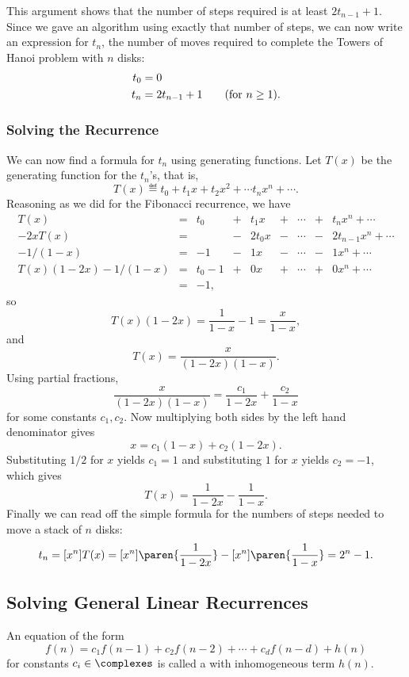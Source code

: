 This argument shows that the number of steps required is at least
$2t_{n-1} + 1$.  Since we gave an algorithm using exactly that number
of steps, we can now write an expression for $t_n$, the number of
moves required to complete the Towers of Hanoi problem with $n$ disks:
\begin{align*}
t_0 & = 0 \\
t_n & = 2t_{n-1} + 1 \text{\qquad (for $n \geq 1$)}.
\end{align*}

\subsubsection{Solving the Recurrence}
We can now find a formula for $t_n$ using generating functions.
Let $T(x)$ be the generating function for the $t_n$'s, that
is,
\[
T(x) \eqdef t_0 + t_1 x + t_2 x^2 + \cdots t_n x^n + \cdots.
\]
Reasoning as we did for the Fibonacci recurrence, we have
\[
\begin{array}{rcrcrcrcrcrcrcr}
T(x)     & = & t_0 & + &  t_1 x & + & \cdots & + &     t_n x^n + \cdots\\
-2xT(x)  & = &     & - & 2t_0 x & - & \cdots & - & 2t_{n-1} x^n + \cdots\\
-1/(1-x) & = &  -1 & -  &   1 x & - & \cdots & - &       1 x^n + \cdots\\
\hline
T(x)(1-2x) - 1/(1-x)
         & = & t_0 -1 & + & 0 x & + & \cdots & + &       0 x^n + \cdots\\
         & = & -1,
\end{array}
\]
so
\[
T(x)(1-2x) = \frac{1}{1-x} -1 = \frac{x}{1-x},
\]
and
\[
T(x) = \frac{x}{(1-2x)(1-x)}.
\]
Using partial fractions,
\[
 \frac{x}{(1-2x)(1-x)} = \frac{c_1}{1-2x} +\frac{c_2}{1-x}
\]
for some constants $c_1,c_2$.  Now multiplying both sides by the left
hand denominator gives
\[
 x = c_1(1-x) +c_2(1-2x).
\]
Substituting $1/2$ for $x$ yields $c_1 = 1$ and substituting $1$ for
$x$ yields $c_2 = - 1$, which gives
\[
T(x) = \frac{1}{1-2x} - \frac{1}{1-x}.
\]
Finally we can read off the simple formula for the numbers of steps
needed to move a stack of $n$ disks:
\[
t_n = [x^n]T(x) = [x^n]\paren{\frac{1}{1-2x}} - [x^n]\paren{\frac{1}{1-x}} = 2^n - 1.
\]

\subsection{Solving General Linear Recurrences}
An equation of the form
\begin{equation}\label{fnc1c2}
f(n) = c_1 f(n-1) + c_2 f(n-2) +  \cdots + c_{d} f(n-d) + h(n)
\end{equation}
for constants $c_i \in \complexes$ is called a  with inhomogeneous term $h(n)$.

